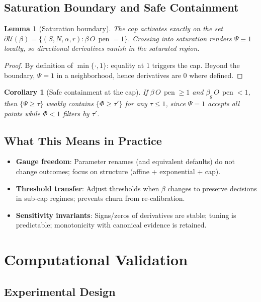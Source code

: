 \documentclass[12pt,a4paper]{article}
\newtheorem{lemma}[theorem]{Lemma}
\newtheorem{corollary}[theorem]{Corollary}
\begin{document}
\subsection{Saturation Boundary and Safe Containment}
\begin{lemma}[Saturation boundary]\label{lem:saturation}
The cap activates exactly on the set $\partial\mathcal{U}(\beta) = \{(S,N,\alpha,r) : \beta\,O\,\operatorname{pen} = 1\}$. Crossing into saturation renders $\Psi\equiv 1$ locally, so directional derivatives vanish in the saturated region.
\end{lemma}
\begin{proof}
By definition of $\min\{\cdot,1\}$: equality at $1$ triggers the cap. Beyond the boundary, $\Psi=1$ in a neighborhood, hence derivatives are $0$ where defined.
\end{proof}

\begin{corollary}[Safe containment at the cap]\label{cor:safe-containment}
If $\beta\,O\,\operatorname{pen} \ge 1$ and $\beta_g\,O\,\operatorname{pen} < 1$, then $\{\Psi \ge \tau\}$ weakly contains $\{\Phi \ge \tau'\}$ for any $\tau\le 1$, since $\Psi=1$ accepts all points while $\Phi<1$ filters by $\tau'$.
\end{corollary}

\subsection{What This Means in Practice}
\begin{itemize}[leftmargin=2em]
  \item \textbf{Gauge freedom}: Parameter renames (and equivalent defaults) do not change outcomes; focus on structure (affine + exponential + cap).
  \item \textbf{Threshold transfer}: Adjust thresholds when $\beta$ changes to preserve decisions in sub-cap regimes; prevents churn from re-calibration.
  \item \textbf{Sensitivity invariants}: Signs/zeros of derivatives are stable; tuning is predictable; monotonicity with canonical evidence is retained.
\end{itemize}

\section{Computational Validation}

\subsection{Experimental Design}
\end{document}

